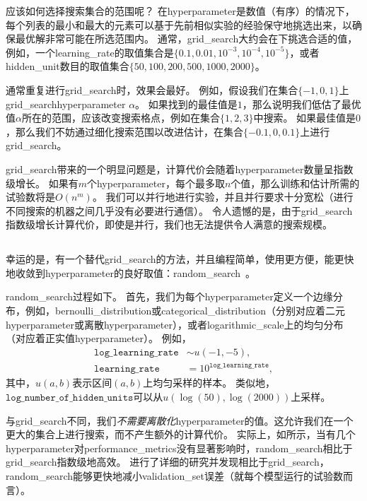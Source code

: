 应该如何选择搜索集合的范围呢？
在\gls{hyperparameter}是数值（有序）的情况下，每个列表的最小和最大的元素可以基于先前相似实验的经验保守地挑选出来，以确保最优解非常可能在所选范围内。
通常，\gls{grid_search}大约会在下挑选合适的值，例如，一个\gls{learning_rate}的取值集合是$\{0.1,0.01,10^{-3},10^{-4},10^{-5}\}$，或者\gls{hidden_unit}数目的取值集合$\{50,100,200,500,1000,2000\}$。


通常重复进行\gls{grid_search}时，效果会最好。
例如，假设我们在集合$\{-1,0,1\}$上\gls{grid_search}\gls{hyperparameter} $\alpha$。
如果找到的最佳值是$1$，那么说明我们低估了最优值$\alpha$所在的范围，应该改变搜索格点，例如在集合$\{1,2,3\}$中搜索。
如果最佳值是$0$，那么我们不妨通过细化搜索范围以改进估计，在集合$\{-0.1,0,0.1\}$上进行\gls{grid_search}。


\gls{grid_search}带来的一个明显问题是，计算代价会随着\gls{hyperparameter}数量呈指数级增长。
如果有$m$个\gls{hyperparameter}，每个最多取$n$个值，那么训练和估计所需的试验数将是$O(n^m)$。
我们可以并行地进行实验，并且并行要求十分宽松（进行不同搜索的机器之间几乎没有必要进行通信）。
令人遗憾的是，由于\gls{grid_search}指数级增长计算代价，即使是并行，我们也无法提供令人满意的搜索规模。


\subsection{}
\label{sec:random_search}
幸运的是，有一个替代\gls{grid_search}的方法，并且编程简单，使用更方便，能更快地收敛到\gls{hyperparameter}的良好取值：\gls{random_search}~\citep{Bergstra+Bengio-2012-small}。


\gls{random_search}过程如下。
首先，我们为每个\gls{hyperparameter}定义一个边缘分布，例如，\gls{bernoulli_distribution}或\gls{categorical_distribution}（分别对应着二元\gls{hyperparameter}或离散\gls{hyperparameter}），或者\gls{logarithmic_scale}上的均匀分布（对应着正实值\gls{hyperparameter}）。
例如，
\begin{align}
	\texttt{log\_learning\_rate} &\sim u(-1, -5), \\
	\texttt{learning\_rate} &= 10^{\texttt{log\_learning\_rate}},
\end{align}
其中，$u(a,b)$表示区间$(a,b)$上均匀采样的样本。
类似地，$\texttt{log\_number\_of\_hidden\_units}$可以从$u(\log(50), \log(2000))$上采样。


与\gls{grid_search}不同，我们\emph{不需要离散化}\gls{hyperparameter}的值。这允许我们在一个更大的集合上进行搜索，而不产生额外的计算代价。%
实际上，如所示，当有几个\gls{hyperparameter}对\gls{performance_metrics}没有显著影响时，\gls{random_search}相比于\gls{grid_search}指数级地高效。
\cite{Bergstra+Bengio-2012-small}进行了详细的研究并发现相比于\gls{grid_search}， \gls{random_search}能够更快地减小\gls{validation_set}误差（就每个模型运行的试验数而言）。

